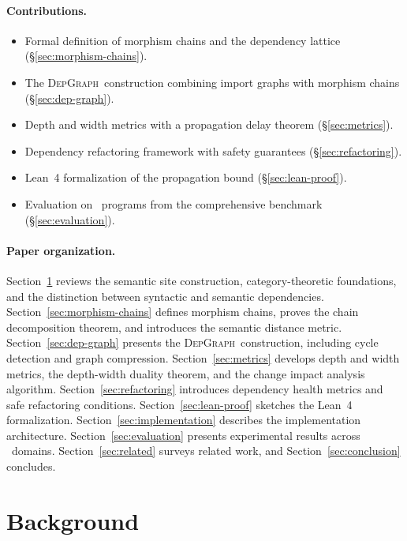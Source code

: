 \documentclass[11pt]{article}
\newcommand{\DepGraph}{\textsc{DepGraph}}
\begin{document}
\paragraph{Contributions.}
\begin{itemize}[noitemsep]
  \item Formal definition of morphism chains and the dependency lattice
        (§\ref{sec:morphism-chains}).
  \item The \DepGraph\ construction combining import graphs with morphism
        chains (§\ref{sec:dep-graph}).
  \item Depth and width metrics with a propagation delay theorem
        (§\ref{sec:metrics}).
  \item Dependency refactoring framework with safety guarantees
        (§\ref{sec:refactoring}).
  \item Lean~4 formalization of the propagation bound
        (§\ref{sec:lean-proof}).
  \item Evaluation on \compTotalPrograms\ programs from the comprehensive
        benchmark (§\ref{sec:evaluation}).
\end{itemize}

\paragraph{Paper organization.}
Section~\ref{sec:background} reviews the semantic site construction,
category-theoretic foundations, and the distinction between syntactic and
semantic dependencies.  Section~\ref{sec:morphism-chains} defines morphism
chains, proves the chain decomposition theorem, and introduces the semantic
distance metric.  Section~\ref{sec:dep-graph} presents the \DepGraph\
construction, including cycle detection and graph compression.
Section~\ref{sec:metrics} develops depth and width metrics, the depth-width
duality theorem, and the change impact analysis algorithm.
Section~\ref{sec:refactoring} introduces dependency health metrics and safe
refactoring conditions.  Section~\ref{sec:lean-proof} sketches the Lean~4
formalization.  Section~\ref{sec:implementation} describes the
implementation architecture.  Section~\ref{sec:evaluation} presents
experimental results across \expDomainCount\ domains.
Section~\ref{sec:related} surveys related work, and
Section~\ref{sec:conclusion} concludes.

\section{Background}\label{sec:background}
\end{document}
